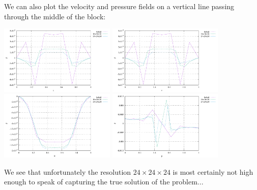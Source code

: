 We can also plot the velocity and pressure fields on a vertical line passing 
through the middle of the block:
\begin{center}
\includegraphics[width=5.5cm]{python_codes/fieldstone_82/RESULTS/bench4/vert_u}
\includegraphics[width=5.5cm]{python_codes/fieldstone_82/RESULTS/bench4/vert_v}
\includegraphics[width=5.5cm]{python_codes/fieldstone_82/RESULTS/bench4/vert_w}
\includegraphics[width=5.5cm]{python_codes/fieldstone_82/RESULTS/bench4/vert_p}
\end{center}
We see that unfortunately the resolution $24\times 24 \times 24$ is most certainly not high 
enough to speak of capturing the true solution of the problem...

